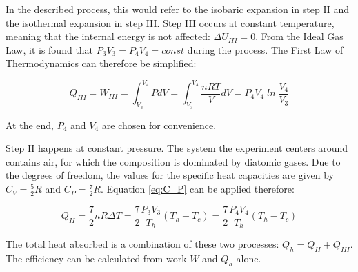 In the described process, this would refer to the isobaric expansion in step II and the isothermal expansion in step III. Step III occurs at constant temperature, meaning that the internal energy is not affected: $\mathit{\Delta U_{III} = 0}$. From the Ideal Gas Law, it is found that $\mathit{P_3 V_3 = P_4 V_4 = const}$ during the process. The First Law of Thermodynamics can therefore be simplified:

\begin{equation}
\label{eq:Q_III}
    \mathit{Q_{III} = W_{III} = \int_{V_3}^{V_4} PdV = \int_{V_3}^{V_4} \frac{nRT}{V}dV = P_4 V_4 \ln{\frac{V_4}{V_3}}}
\end{equation}

At the end, $\mathit{P_4}$ and $\mathit{V_4}$ are chosen for convenience. 

Step II happens at constant pressure. 
The system the experiment centers around contains air, for which the composition is dominated by diatomic gases. Due to the degrees of freedom, the values for the specific heat capacities are given by $\mathit{C_V = \frac{5}{2}R}$ and $\mathit{C_P = \frac{7}{2}R}$. Equation \ref{eq:C_P} can be applied therefore:

\begin{equation}
\label{eq:Q_II}
    \mathit{Q_{II} = \frac{7}{2}nR \Delta T = \frac{7}{2} \frac{P_3 V_3}{T_h} (T_h-T_c) = \frac{7}{2} \frac{P_4 V_4}{T_h} (T_h-T_c)}
\end{equation}

The total heat absorbed is a combination of these two processes: $\mathit{Q_h = Q_{II} + Q_{III}}$.
The efficiency can be calculated from work $\mathit{W}$ and $\mathit{Q_h}$ alone.
